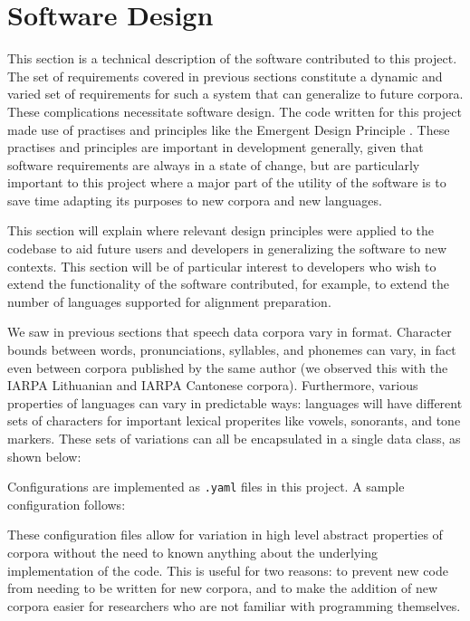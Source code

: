 \documentclass[11pt]{article}
\begin{document}
\section{Software Design}

This section is a technical description of the software contributed to this project. The set of requirements covered in previous sections constitute a dynamic and varied set of requirements for such a system that can generalize to future corpora. These complications necessitate software design. The code written for this project made use of practises and principles like the Emergent Design Principle \cite{bain_emergent_2008}. These practises and principles are important in development generally, given that software requirements are always in a state of change, but are particularly important to this project where a major part of the utility of the software is to save time adapting its purposes to new corpora and new languages. 

This section will explain where relevant design principles were applied to the codebase to aid future users and developers in generalizing the software to new contexts. This section will be of particular interest to developers who wish to extend the functionality of the software contributed, for example, to extend the number of languages supported for alignment preparation.

We saw in previous sections that speech data corpora vary in format. Character bounds between words, pronunciations, syllables, and phonemes can vary, in fact even between corpora published by the same author (we observed this with the IARPA Lithuanian and IARPA Cantonese corpora). Furthermore, various properties of languages can vary in predictable ways: languages will have different sets of characters for important lexical properites like vowels, sonorants, and tone markers. These sets of variations can all be encapsulated in a single data class, as shown below:


Configurations are implemented as \verb|.yaml| files in this project. A sample configuration follows:


These configuration files allow for variation in high level abstract properties of corpora without the need to known anything about the underlying implementation of the code. This is useful for two reasons: to prevent new code from needing to be written for new corpora, and to make the addition of new corpora easier for researchers who are not familiar with programming themselves.
\end{document}
